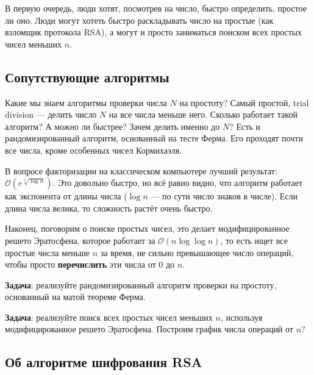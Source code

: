 \documentclass[12pt]{article}
\begin{document}
В первую очередь, люди хотят, посмотрев на число, быстро определить, простое ли оно. Люди могут хотеть быстро раскладывать число на простые (как взломщик протокола RSA), а могут и просто заниматься поиском всех простых чисел меньших $n$.

\subsection*{Сопутствующие алгоритмы}
Какие мы знаем алгоритмы проверки числа $N$ на простоту? Самый простой, trial division --- делить число $N$ на все числа меньше него. Сколько работает такой алгоритм? А можно ли быстрее? Зачем делить именно до $N$? Есть и рандомизированный алгоритм, основанный на тесте Ферма. Его проходят почти все числа, кроме особенных чисел Кормихаэля.

В вопросе факторизации на классическом компьютере лучший результат: $\mathcal{O}(e^{\sqrt[3]{\log n}})$. Это довольно быстро, но всё равно видно, что алгоритм работает как экспонента от длины числа ($\log n$ --- по сути число знаков в числе). Если длина числа велика, то сложность растёт очень быстро.

Наконец, поговорим о поиске простых чисел, это делает модифицированное решето Эратосфена, которое работает за $\mathcal{O}(n \log \log n)$, то есть ищет все простые числа меньше $n$ за время, не сильно превышающее число операций, чтобы просто {\bf перечислить} эти числа от $0$ до $n$.

{\bf Задача}: реализуйте рандомизированный алгоритм проверки на простоту, основанный на матой теореме Ферма.

{\bf Задача}: реализуйте поиск всех простых чисел меньших $n$, используя модифицированное решето Эратосфена. Построим график числа операций от $n$?

\subsection*{Об алгоритме шифрования RSA}
\end{document}
